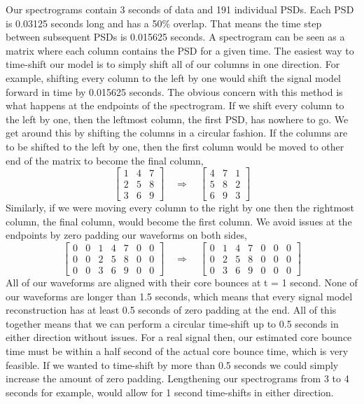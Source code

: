 Our spectrograms contain 3 seconds of data and 191 individual PSDs. Each PSD is 0.03125 seconds long and has a 50\% overlap. That means the time step between subsequent PSDs is 0.015625 seconds. A spectrogram can be seen as a matrix where each column contains the PSD for a given time. The easiest way to time-shift our model is to simply shift all of our columns in one direction.  For example, shifting every column to the left by one would shift the signal model forward in time by 0.015625 seconds. The obvious concern with this method is what happens at the endpoints of the spectrogram. If we shift every column to the left by one, then the leftmost column, the first PSD, has nowhere to go. We get around this by shifting the columns in a circular fashion. If the columns are to be shifted to the left by one, then the first column would be moved to other end of the matrix to become the final column,
\begin{equation}
    \begin{bmatrix}
    1 & 4 & 7 \\
    2 & 5 & 8 \\
    3 & 6 & 9
    \end{bmatrix}
    \quad \Rightarrow \quad
    \begin{bmatrix}
    4 & 7 & 1 \\
    5 & 8 & 2 \\
    6 & 9 & 3
    \end{bmatrix}
\end{equation}
Similarly, if we were moving every column to the right by one then the rightmost column, the final column, would become the first column. We avoid issues at the endpoints by zero padding our waveforms on both sides,
\begin{equation}
    \begin{bmatrix}
    0 & 0 & 1 & 4 & 7 & 0 & 0 \\
    0 & 0 & 2 & 5 & 8 & 0 & 0 \\
    0 & 0 & 3 & 6 & 9 & 0 & 0
    \end{bmatrix}
    \quad \Rightarrow \quad
    \begin{bmatrix}
    0 & 1 & 4 & 7 & 0 & 0 & 0 \\
    0 & 2 & 5 & 8 & 0 & 0 & 0 \\
    0 & 3 & 6 & 9 & 0 & 0 & 0
    \end{bmatrix}
\end{equation}
All of our waveforms are aligned with their core bounces at t = 1 second. None of our waveforms are longer than 1.5 seconds, which means that every signal model reconstruction has at least 0.5 seconds of zero padding at the end. All of this together means that we can perform a circular time-shift up to 0.5 seconds in either direction without issues. For a real signal then, our estimated core bounce time must be within a half second of the actual core bounce time, which is very feasible. If we wanted to time-shift by more than 0.5 seconds we could simply increase the amount of zero padding. Lengthening our spectrograms from 3 to 4 seconds for example, would allow for 1 second time-shifts in either direction.

